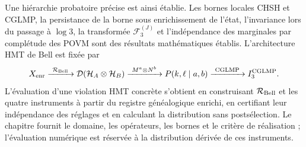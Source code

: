 Une hiérarchie probatoire précise est ainsi établie. Les bornes locales CHSH et CGLMP, la persistance de la borne sous enrichissement de l’état, l’invariance lors du passage à \(\log 3\), la transformée \(\mathcal F_3^{(J)}\) et l’indépendance des marginales par complétude des POVM sont des résultats mathématiques établis. L’architecture HMT de Bell est fixée par
\[
 X_{\rm enr}
 \xrightarrow{\ \mathcal R_{\rm Bell}\ }
 \mathcal D(\mathcal H_A\otimes\mathcal H_B)
 \xrightarrow{\ M^a\otimes N^b\ }
 P(k,\ell\mid a,b)
 \xrightarrow{\ \mathrm{CGLMP}\ }
 I_3^{\rm CGLMP}.
\]
L’évaluation d’une violation HMT concrète s’obtient en construisant \(\mathcal R_{\rm Bell}\) et les quatre instruments à partir du registre généalogique enrichi, en certifiant leur indépendance des réglages et en calculant la distribution sans postsélection. Le chapitre fournit le domaine, les opérateurs, les bornes et le critère de réalisation ; l’évaluation numérique est réservée à la distribution dérivée de ces instruments.
